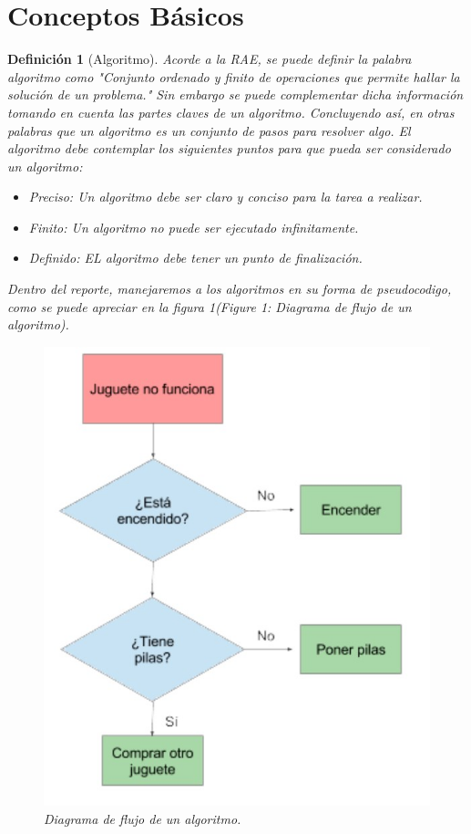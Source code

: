 \documentclass[12pt,twoside]{article}
\newtheorem{defi}{Definición}
\begin{document}
\section{Conceptos B\'asicos}
\begin{defi}[Algoritmo]
Acorde a la RAE, se puede definir la palabra algoritmo como "Conjunto ordenado y finito de operaciones que permite hallar la solución de un problema."
Sin embargo se puede complementar dicha informaci\'on tomando en cuenta las partes claves de un algoritmo.
Concluyendo así, en otras palabras que un algoritmo es un conjunto de pasos para resolver algo.
El algoritmo debe contemplar los siguientes puntos para que pueda ser considerado un algoritmo:
\begin{itemize}
\item Preciso: Un algoritmo debe ser claro y conciso para la tarea a realizar.
\item Finito: Un algoritmo no puede ser ejecutado infinitamente.
\item Definido: EL algoritmo debe tener un punto de finalización.
\end{itemize} 
Dentro del reporte, manejaremos a los algoritmos en su forma de pseudocodigo, como se puede apreciar en la figura 1(Figure 1: Diagrama de flujo de un algoritmo).
\begin{figure}[h!]
\centering
\includegraphics[scale=0.5]{algoritmo.jpg}
\caption{Diagrama de flujo de un algoritmo.}
\label{fig:universe}
\end{figure}

\end{defi}
\end{document}
